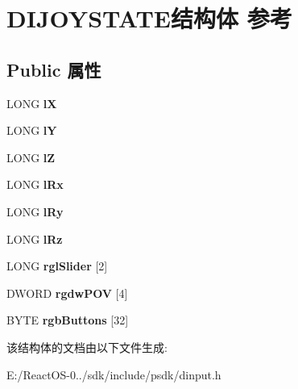 \hypertarget{struct_d_i_j_o_y_s_t_a_t_e}{}\section{D\+I\+J\+O\+Y\+S\+T\+A\+T\+E结构体 参考}
\label{struct_d_i_j_o_y_s_t_a_t_e}
\subsection*{Public 属性}
\begin{DoxyCompactItemize}
\item 
\mbox{\label{struct_d_i_j_o_y_s_t_a_t_e_abd924b6e2f5a609b5313edf5547cf0b9}} 
L\+O\+NG {\bfseries lX}
\item 
\mbox{\label{struct_d_i_j_o_y_s_t_a_t_e_ad604b49945189573c286a6bd182df906}} 
L\+O\+NG {\bfseries lY}
\item 
\mbox{\label{struct_d_i_j_o_y_s_t_a_t_e_a8ea67d52b3e9d4ce1500a748c34aa773}} 
L\+O\+NG {\bfseries lZ}
\item 
\mbox{\label{struct_d_i_j_o_y_s_t_a_t_e_a6232dc3ea7429cb73ff11df70276312d}} 
L\+O\+NG {\bfseries l\+Rx}
\item 
\mbox{\label{struct_d_i_j_o_y_s_t_a_t_e_a0ede2ea7033e37c69a7f1d73eec5967a}} 
L\+O\+NG {\bfseries l\+Ry}
\item 
\mbox{\label{struct_d_i_j_o_y_s_t_a_t_e_a4baa12ccd83518de5ddca79a266e9bbc}} 
L\+O\+NG {\bfseries l\+Rz}
\item 
\mbox{\label{struct_d_i_j_o_y_s_t_a_t_e_ad26c1ad71dc41ff0898d61b0e1a42500}} 
L\+O\+NG {\bfseries rgl\+Slider} \mbox{[}2\mbox{]}
\item 
\mbox{\label{struct_d_i_j_o_y_s_t_a_t_e_aca1b966c7e6143fca9483745b370051f}} 
D\+W\+O\+RD {\bfseries rgdw\+P\+OV} \mbox{[}4\mbox{]}
\item 
\mbox{\label{struct_d_i_j_o_y_s_t_a_t_e_ac9e24ad056dfbdce0b5c49558a8e7012}} 
B\+Y\+TE {\bfseries rgb\+Buttons} \mbox{[}32\mbox{]}
\end{DoxyCompactItemize}


该结构体的文档由以下文件生成\+:\begin{DoxyCompactItemize}
\item 
E\+:/\+React\+O\+S-\/0../sdk/include/psdk/dinput.\+h\end{DoxyCompactItemize}
